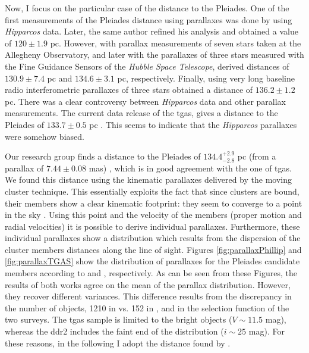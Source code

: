Now, I focus on the particular case of the distance to the Pleiades. One of the first measurements of the Pleiades distance using parallaxes was done by \citet{1999A&A...341L..71V} using \emph{Hipparcos} data.{ Later, the same author \citep{2009A&A...497..209V} refined his analysis and obtained a value of $120\pm1.9$ pc. However, \citet{2000ApJ...533..938G} with parallax measurements of seven stars taken at the Allegheny Observatory, and later \citet{2005AJ....129.1616S} with the parallaxes of three stars measured with the Fine Guidance Sensors of the \emph{Hubble Space Telescope}, derived distances of $130.9\pm7.4$ pc and $134.6\pm3.1$ pc, respectively. Finally, \citet{2014Sci...345.1029M} using very long baseline radio interferometric parallaxes of three stars obtained a distance of $136.2\pm1.2$ pc.} There was a clear controversy between \emph{Hipparcos} data and other parallax measurements. The current data release of the \gls{tgas}, gives a distance to the Pleiades of $133.7\pm0.5$ pc \cite[from a parallax of $7.48\pm0.03$ mas][]{2017A&A...601A..19G}. This seems to indicate that the \emph{Hipparcos} parallaxes were somehow biased.

Our research group finds a distance to the Pleiades of $134.4^{+2.9}_{-2.8} $ pc (from a parallax of $7.44\pm0.08$ mas) \citep{Galli2017}, which is in good agreement with the one of \gls{tgas}. We found this distance using the kinematic parallaxes delivered by the moving cluster technique. This essentially exploits the fact that since clusters are bound, their members show a clear kinematic footprint: they seem to converge to a point in the sky \citep{1964IAUS...20...50B}. Using this point and the velocity of the members (proper motion and radial velocities) it is possible to derive individual parallaxes. Furthermore, these individual parallaxes show a distribution which results from the dispersion of the cluster members distances along the line of sight. Figures \ref{fig:parallaxPhillip} and \ref{fig:parallaxTGAS} show the distribution of parallaxes for the Pleiades candidate members according to \citet{Galli2017} and \citet{2017A&A...601A..19G}, respectively. As can be seen from these Figures, the results of both works agree on the mean of the parallax distribution. However, they recover different variances. This difference results from the discrepancy in the number of objects, 1210 in \citet{Galli2017} vs. 152 in \citet{2017A&A...601A..19G}, and in the selection function of the two surveys. The \gls{tgas} sample is limited to the bright objects ($V \sim 11.5$ mag), whereas the \gls{ddr2} includes the faint end of the distribution ($i\sim25$ mag). For these reasons, in the following I adopt the distance found by \citet{Galli2017}.

